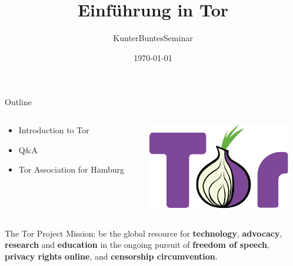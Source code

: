 \documentclass[aspectratio=169,10pt]{beamer}
\title{Einführung in Tor}
\subtitle{KunterBuntesSeminar}
\date{\today}
\author{}
\institute{FBI}
\begin{document}
  
  \maketitle
  
  \begin{frame}[fragile]{Outline}
    \begin{columns}
      \begin{column}{0.5\textwidth}
        \begin{itemize}
          \item Introduction to Tor
          \item Q\&A
          \item Tor Association for Hamburg
        \end{itemize}
      \end{column}
      \begin{column}{0.5\textwidth}
        \begin{center}
          \begin{overlayarea}{\textwidth}{0.5\textheight}
            \includegraphics[width=\textwidth]{img/Color.pdf}
          \end{overlayarea}
        \end{center}
      \end{column}
    \end{columns}
  \end{frame}
  
  
  \begin{frame}[fragile]{The Tor Project}
    \alert{Mission:} be the global resource for \textbf{technology}, \textbf{advocacy}, \textbf{research} and \textbf{education} in the ongoing pursuit of \textbf{freedom of speech}, \textbf{privacy rights online}, and \textbf{censorship circumvention}.
  \end{frame}
  
\end{document}
